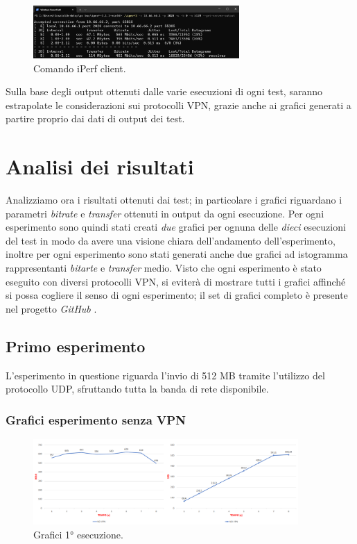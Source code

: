 \begin{figure}[h] \includegraphics[width=0.7\textwidth] {Tesi magistrale/capitoli/images/iPerf client.png}
\centering
\caption{Comando iPerf client.}
\end{figure}

\newpage

Sulla base degli output ottenuti dalle varie esecuzioni di ogni test, saranno estrapolate le considerazioni sui protocolli VPN, grazie anche ai grafici generati a partire proprio dai dati di output dei test.

\section{Analisi dei risultati}
Analizziamo ora i risultati ottenuti dai test; in particolare i grafici riguardano i parametri \emph{bitrate} e \emph{transfer} ottenuti in output da ogni esecuzione. Per ogni esperimento sono quindi stati creati \emph{due} grafici per ognuna delle \emph{dieci} esecuzioni del test in modo da avere una visione chiara dell'andamento dell'esperimento, inoltre per ogni esperimento sono stati generati anche due grafici ad istogramma rappresentanti \emph{bitarte} e \emph{transfer} medio. Visto che ogni esperimento è stato eseguito con diversi protocolli VPN, si eviterà di mostrare tutti i grafici affinché si possa cogliere il senso di ogni esperimento; il set di grafici completo è presente nel progetto \emph{GitHub} \cite{pro}.

\newpage
\subsection{Primo esperimento}
L'esperimento in questione riguarda l'invio di 512 MB tramite l'utilizzo del protocollo UDP, sfruttando tutta la banda di rete disponibile.

\subsubsection{Grafici esperimento senza VPN}

\begin{figure}[h] \includegraphics[width=0.9\textwidth] {Tesi magistrale/capitoli/images/1.png}
\centering
\caption{Grafici 1° esecuzione.}
\end{figure}

